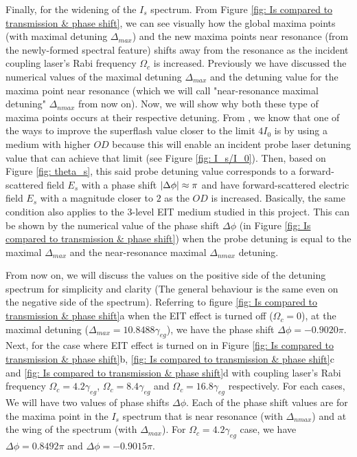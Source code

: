 Finally, for the widening of the $I_{s}$ spectrum. From Figure \ref{fig: Is compared to transmission & phase shift}, we can see visually how the global maxima points (with maximal detuning $\Delta_{max}$) and the new maxima points near resonance (from the newly-formed spectral feature) shifts away from the resonance as the incident coupling laser's Rabi frequency $\Omega_{c}$ is increased. Previously we have discussed the numerical values of the maximal detuning $\Delta_{max}$ and the detuning value for the maxima point near resonance (which we will call "near-resonance maximal detuning" $\Delta_{nmax}$ from now on). Now, we will show why both these type of maxima points occurs at their respective detuning. From , we know that one of the ways to improve the superflash value closer to the limit $4I_{0}$ is by using a medium with higher $OD$ because this will enable an incident probe laser detuning value that can achieve that limit (see Figure \ref{fig: I_s/I_0}). Then, based on Figure \ref{fig: theta_s}, this said probe detuning value corresponds to a forward-scattered field $E_{s}$ with a phase shift $\abs{\Delta\phi} \approx \pi$ and have forward-scattered electric field $E_{s}$ with a magnitude closer to $2$ as the $OD$ is increased. Basically, the same condition also applies to the 3-level EIT medium studied in this project. This can be shown by the numerical value of the phase shift $\Delta\phi$  (in Figure \ref{fig: Is compared to transmission & phase shift}) when the probe detuning is equal to the maximal $\Delta_{max}$ and the near-resonance maximal $\Delta_{nmax}$ detuning.

From now on, we will discuss the values on the positive side of the detuning spectrum for simplicity and clarity (The general behaviour is the same even on the negative side of the spectrum). Referring to figure \ref{fig: Is compared to transmission & phase shift}a when the EIT effect is turned off ($\Omega_{c} = 0$), at the maximal detuning ($\Delta_{max} = 10.8488\gamma_{eg}$), we have the phase shift $\Delta\phi = -0.9020\pi$. Next, for the case where EIT effect is turned on in Figure \ref{fig: Is compared to transmission & phase shift}b, \ref{fig: Is compared to transmission & phase shift}c and \ref{fig: Is compared to transmission & phase shift}d with coupling laser's Rabi frequency $\Omega_{c} = 4.2\gamma_{eg}$, $\Omega_{c} = 8.4\gamma_{eg}$ and $\Omega_{c} = 16.8\gamma_{eg}$ respectively. For each cases, We will have two values of phase shifts $\Delta\phi$. Each of the phase shift values are for the maxima point in the $I_{s}$ spectrum that is near resonance (with $\Delta_{nmax}$) and at the wing of the spectrum (with $\Delta_{max}$). For $\Omega_{c} = 4.2\gamma_{eg}$ case, we have $\Delta\phi = 0.8492\pi$ and $\Delta\phi = -0.9015\pi$.  

